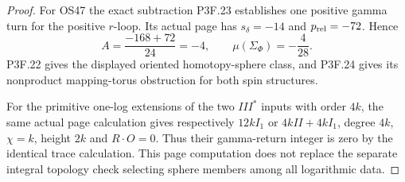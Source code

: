 \begin{proof}
For OS47 the exact subtraction P3F.23 establishes one positive gamma turn for the positive \(r\)-loop. Its actual page has \(s_\delta=-14\) and \(p_{\rm rel}=-72\). Hence \[
 A=\frac{-168+72}{24}=-4,
 \qquad\mu(\Sigma_\Phi)=-\frac4{28}.
\] P3F.22 gives the displayed oriented homotopy-sphere class, and P3F.24 gives its nonproduct mapping-torus obstruction for both spin structures.

For the primitive one-log extensions of the two \(III^*\) inputs with order \(4k\), the same actual page calculation gives respectively \(12kI_1\) or \(4kII+4kI_1\), degree \(4k\), \(\chi=k\), height \(2k\) and \(R\cdot O=0\). Thus their gamma-return integer is zero by the identical trace calculation. This page computation does not replace the separate integral topology check selecting sphere members among all logarithmic data.
\end{proof}
